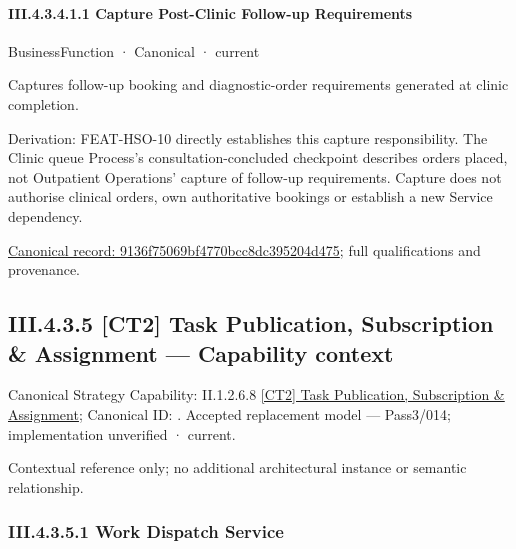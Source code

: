 \paragraph*{III.4.3.4.1.1 Capture Post-Clinic Follow-up Requirements}
\label{navigation:III.4.3.4.1.1}

\label{element:9136f75069bf4770bcc8dc395204d475}
{\small BusinessFunction · Canonical · current}\par

Captures follow-up booking and diagnostic-order requirements generated at clinic completion.



Derivation: FEAT-HSO-10 directly establishes this capture responsibility. The Clinic queue Process's consultation-concluded checkpoint describes orders placed, not Outpatient Operations' capture of follow-up requirements. Capture does not authorise clinical orders, own authoritative bookings or establish a new Service dependency.


{\footnotesize \href{../../../../../../../../continuum/business/business-function/9136f75069bf4770bcc8dc395204d475.md}{Canonical record: 9136f75069bf4770bcc8dc395204d475}; full qualifications and provenance.}\par
\subsection*{III.4.3.5 [CT2] Task Publication, Subscription \& Assignment — Capability context}
\label{navigation:III.4.3.5}

{\small Canonical Strategy Capability: II.1.2.6.8 \hyperref[element:f41e5bfc2b5845bbbb3290ecf8b57892]{[CT2] Task Publication, Subscription \& Assignment}; Canonical ID: \texttt{}. Accepted replacement model — Pass3/014; implementation unverified · current.}\par
Contextual reference only; no additional architectural instance or semantic relationship.\par
\subsubsection*{III.4.3.5.1 Work Dispatch Service}
\label{navigation:III.4.3.5.1}

